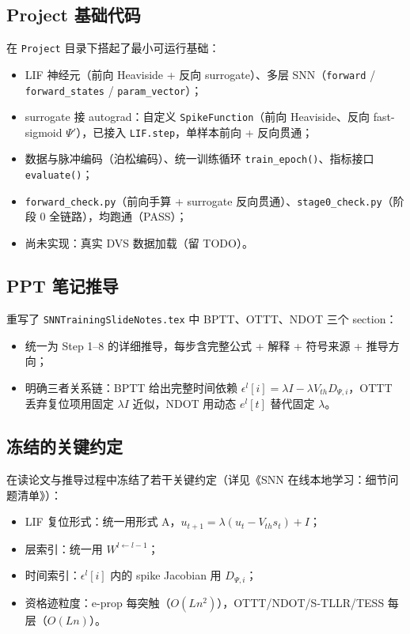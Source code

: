 \documentclass[journal,12pt,onecolumn]{IEEEtran}
\begin{document}
\subsection{Project 基础代码}

在 \texttt{Project} 目录下搭起了最小可运行基础：

\begin{itemize}[leftmargin=1.5em,itemsep=2pt]
\item LIF 神经元（前向 Heaviside + 反向 surrogate）、多层 SNN（\texttt{forward} / \texttt{forward\_states} / \texttt{param\_vector}）；
\item surrogate 接 autograd：自定义 \texttt{SpikeFunction}（前向 Heaviside、反向 fast-sigmoid $\Psi'$），已接入 \texttt{LIF.step}，单样本前向 + 反向贯通；
\item 数据与脉冲编码（泊松编码）、统一训练循环 \texttt{train\_epoch()}、指标接口 \texttt{evaluate()}；
\item \texttt{forward\_check.py}（前向手算 + surrogate 反向贯通）、\texttt{stage0\_check.py}（阶段 0 全链路），均跑通（PASS）；
\item 尚未实现：真实 DVS 数据加载（留 TODO）。
\end{itemize}

\subsection{PPT 笔记推导}

重写了 \texttt{SNNTrainingSlideNotes.tex} 中 BPTT、OTTT、NDOT 三个 section：

\begin{itemize}[leftmargin=1.5em,itemsep=2pt]
\item 统一为 Step 1--8 的详细推导，每步含完整公式 + 解释 + 符号来源 + 推导方向；
\item 明确三者关系链：BPTT 给出完整时间依赖 $\epsilon^l[i]=\lambda I-\lambda V_{th}D_{\Psi,i}$，OTTT 丢弃复位项用固定 $\lambda I$ 近似，NDOT 用动态 $e^l[t]$ 替代固定 $\lambda$。
\end{itemize}

\subsection{冻结的关键约定}

在读论文与推导过程中冻结了若干关键约定（详见《SNN 在线本地学习：细节问题清单》）：

\begin{itemize}[leftmargin=1.5em,itemsep=2pt]
\item LIF 复位形式：统一用形式 A，$u_{t+1}=\lambda(u_t-V_{th}s_t)+I$；
\item 层索引：统一用 $W^{l\leftarrow l-1}$；
\item 时间索引：$\epsilon^l[i]$ 内的 spike Jacobian 用 $D_{\Psi,i}$；
\item 资格迹粒度：e-prop 每突触（$O(Ln^2)$），OTTT/NDOT/S-TLLR/TESS 每层（$O(Ln)$）。
\end{itemize}
\end{document}
